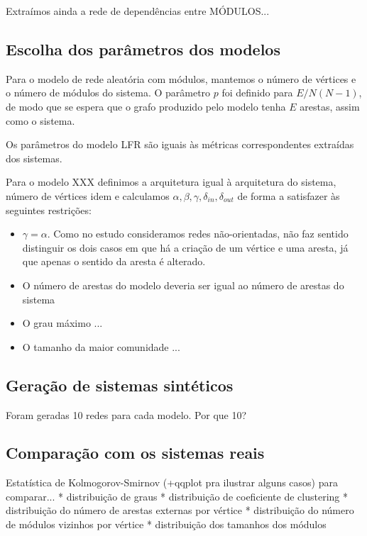 \documentclass{acm_proc_article-sp}
\begin{document}
Extraímos ainda a rede de dependências entre MÓDULOS...

\subsection{Escolha dos parâmetros dos modelos}

Para o modelo de rede aleatória com módulos, mantemos o número de vértices e o número de módulos do sistema. O parâmetro $p$ foi definido para $E / N(N-1)$, de modo que se espera que o grafo produzido pelo modelo tenha $E$ arestas, assim como o sistema.

Os parâmetros do modelo LFR são iguais às métricas correspondentes extraídas dos sistemas.

Para o modelo XXX definimos a arquitetura igual à arquitetura do sistema, número de vértices idem e calculamos $\alpha, \beta, \gamma, \delta_{in}, \delta_{out}$ de forma a satisfazer às seguintes restrições:
\begin{itemize}
  \item $\gamma = \alpha$. Como no estudo consideramos redes não-orientadas, não faz sentido distinguir os dois casos em que há a criação de um vértice e uma aresta, já que apenas o sentido da aresta é alterado.
  \item O número de arestas do modelo deveria ser igual ao número de arestas do sistema
  \item O grau máximo ...
  \item O tamanho da maior comunidade ...
\end{itemize}

\subsection{Geração de sistemas sintéticos}

Foram geradas 10 redes para cada modelo. Por que 10?

\subsection{Comparação com os sistemas reais}

Estatística de Kolmogorov-Smirnov (+qqplot pra ilustrar alguns casos) para comparar...
* distribuição de graus
* distribuição de coeficiente de clustering
* distribuição do número de arestas externas por vértice
* distribuição do número de módulos vizinhos por vértice
* distribuição dos tamanhos dos módulos
\end{document}
